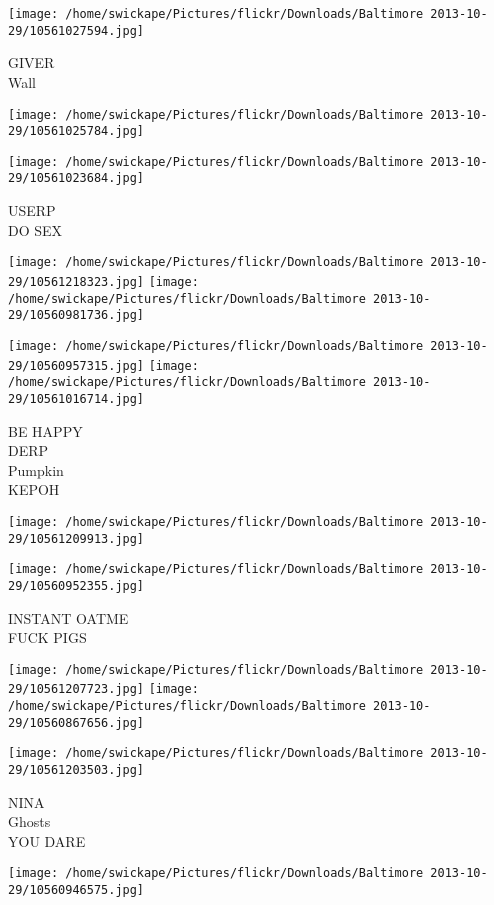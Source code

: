 \documentclass[10pt,letterpaper]{article}
\begin{document}
\vspace{0.25in}
\texttt{[image: /home/swickape/Pictures/flickr/Downloads/Baltimore 2013-10-29/10561027594.jpg]}

GIVER\\
Wall
\pagebreak

\texttt{[image: /home/swickape/Pictures/flickr/Downloads/Baltimore 2013-10-29/10561025784.jpg]}

\vspace{0.25in}
\texttt{[image: /home/swickape/Pictures/flickr/Downloads/Baltimore 2013-10-29/10561023684.jpg]}

USERP\\
DO SEX
\pagebreak

\texttt{[image: /home/swickape/Pictures/flickr/Downloads/Baltimore 2013-10-29/10561218323.jpg]}
\texttt{[image: /home/swickape/Pictures/flickr/Downloads/Baltimore 2013-10-29/10560981736.jpg]}

\texttt{[image: /home/swickape/Pictures/flickr/Downloads/Baltimore 2013-10-29/10560957315.jpg]}
\texttt{[image: /home/swickape/Pictures/flickr/Downloads/Baltimore 2013-10-29/10561016714.jpg]}

BE HAPPY\\
DERP\\
Pumpkin\\
KEPOH
\pagebreak

\texttt{[image: /home/swickape/Pictures/flickr/Downloads/Baltimore 2013-10-29/10561209913.jpg]}

\vspace{0.25in}
\texttt{[image: /home/swickape/Pictures/flickr/Downloads/Baltimore 2013-10-29/10560952355.jpg]}

INSTANT OATME\\
FUCK PIGS
\pagebreak

\texttt{[image: /home/swickape/Pictures/flickr/Downloads/Baltimore 2013-10-29/10561207723.jpg]}
\texttt{[image: /home/swickape/Pictures/flickr/Downloads/Baltimore 2013-10-29/10560867656.jpg]}

\texttt{[image: /home/swickape/Pictures/flickr/Downloads/Baltimore 2013-10-29/10561203503.jpg]}

NINA\\
Ghosts\\
YOU DARE
\pagebreak

\texttt{[image: /home/swickape/Pictures/flickr/Downloads/Baltimore 2013-10-29/10560946575.jpg]}
\end{document}
